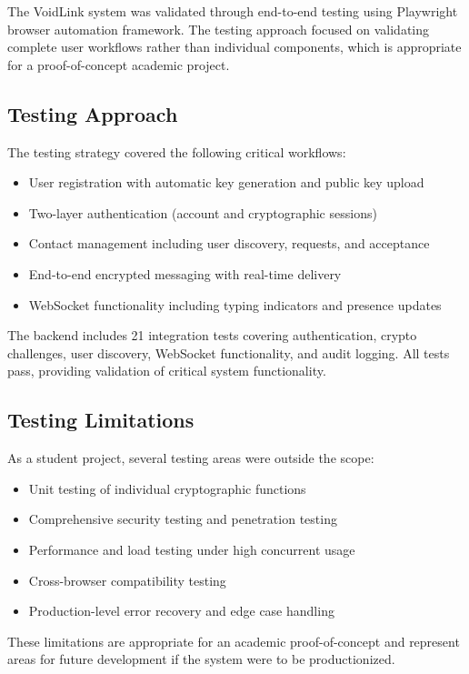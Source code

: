 \documentclass[12pt,a4paper,openany]{book}
\begin{document}
The VoidLink system was validated through end-to-end testing using Playwright browser automation framework. The testing approach focused on validating complete user workflows rather than individual components, which is appropriate for a proof-of-concept academic project.

\subsection{Testing Approach}

The testing strategy covered the following critical workflows:

\begin{itemize}
\item User registration with automatic key generation and public key upload
\item Two-layer authentication (account and cryptographic sessions)
\item Contact management including user discovery, requests, and acceptance
\item End-to-end encrypted messaging with real-time delivery
\item WebSocket functionality including typing indicators and presence updates
\end{itemize}

The backend includes 21 integration tests covering authentication, crypto challenges, user discovery, WebSocket functionality, and audit logging. All tests pass, providing validation of critical system functionality.

\subsection{Testing Limitations}

As a student project, several testing areas were outside the scope:

\begin{itemize}
\item Unit testing of individual cryptographic functions
\item Comprehensive security testing and penetration testing
\item Performance and load testing under high concurrent usage
\item Cross-browser compatibility testing
\item Production-level error recovery and edge case handling
\end{itemize}

These limitations are appropriate for an academic proof-of-concept and represent areas for future development if the system were to be productionized.
\end{document}
